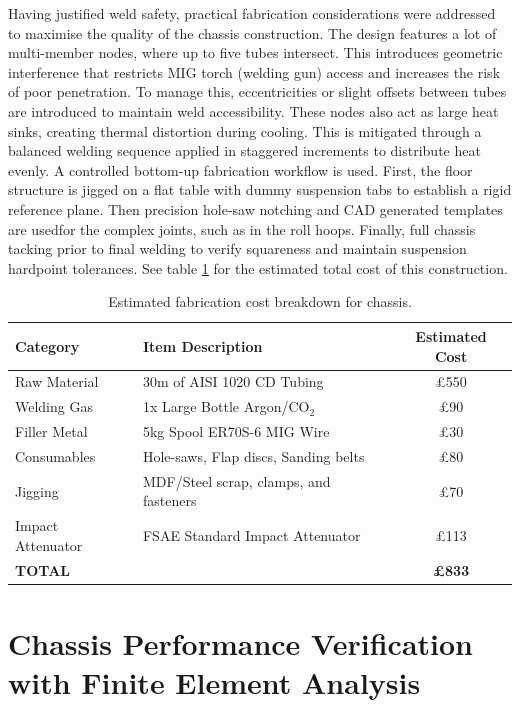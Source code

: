 \documentclass[11pt, a4paper]{report}
\numberwithin{equation}{section}
\begin{document}
\begin{refsection}
Having justified weld safety, practical fabrication considerations were addressed to maximise the quality of the chassis construction. The design features a lot of multi-member nodes, where up to five tubes intersect. This introduces geometric interference that restricts MIG torch (welding gun) access and increases the risk of poor penetration. To manage this, eccentricities or slight offsets between tubes are introduced to maintain weld accessibility. These nodes also act as large heat sinks, creating thermal distortion during cooling. This is mitigated through a balanced welding sequence applied in staggered increments to distribute heat evenly. A controlled bottom-up fabrication workflow is used. First, the floor structure is jigged on a flat table with dummy suspension tabs to establish a rigid reference plane. Then precision hole-saw notching and CAD generated templates are usedfor the complex joints, such as in the roll hoops. Finally, full chassis tacking prior to final welding to verify squareness and maintain suspension hardpoint tolerances. See table \ref{tab:chassis_cost_breakdown} for the estimated total cost of this construction.

\begin{table}[h]
    \centering
    \caption{Estimated fabrication cost breakdown for chassis.}
    \label{tab:chassis_cost_breakdown}
    \footnotesize
    \begin{tabular}{|l|l|c|}
        \hline
        \textbf{Category} & \textbf{Item Description} & \textbf{Estimated Cost} \\
        \hline
        Raw Material & 30m of AISI 1020 CD Tubing \cite{matweb_aisi1020} & £550 \\
        Welding Gas & 1x Large Bottle Argon/CO$_2$ & £90 \\
        Filler Metal & 5kg Spool ER70S-6 MIG Wire & £30 \\
        Consumables & Hole-saws, Flap discs, Sanding belts & £80 \\
        Jigging & MDF/Steel scrap, clamps, and fasteners & £70 \\
        Impact Attenuator & FSAE Standard Impact Attenuator \cite{fsae_impact_attenuator} & £113 \\
        \hline
        \textbf{TOTAL} &  & \textbf{£833} \\
        \hline
    \end{tabular}
\end{table}

\section{Chassis Performance Verification with Finite Element Analysis}


\end{refsection}
\end{document}
